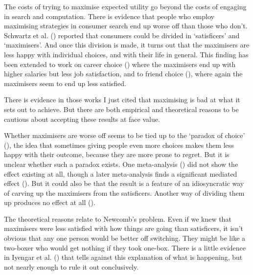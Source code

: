 \documentclass[
  10pt,
  letterpaper,
  twoside]{scrbook}
\begin{document}
The costs of trying to maximise expected utility go beyond the costs of
engaging in search and computation. There is evidence that people who
employ maximising strategies in consumer search end up worse off than
those who don't. Schwartz et al. ()
reported that consumers could be divided in `satisficers' and
`maximisers'. And once this division is made, it turns out that the
maximisers are less happy with individual choices, and with their life
in general. This finding has been extended to work on career choice
()
where the maximisers end up with higher salaries but less job
satisfaction, and to friend choice
(), where again the maximisers seem to end up less satisfied.

There is evidence in those works I just cited that maximising is bad at
what it sets out to achieve. But there are both empirical and
theoretical reasons to be cautious about accepting these results at face
value.

Whether maximisers are worse off seems to be tied up to the `paradox of
choice' (), the idea that
sometimes giving people even more choices makes them less happy with
their outcome, because they are more prone to regret. But it is unclear
whether such a paradox exists. One meta-analysis
() did not show the effect existing at all, though a later
meta-analysis finds a significant mediated effect
().
But it could also be that the result is a feature of an idiosyncratic
way of carving up the maximisers from the satisficers. Another way of
dividing them up produces no effect at all
().

The theoretical reasons relate to Newcomb's problem. Even if we knew
that maximisers were less satisfied with how things are going than
satisficers, it isn't obvious that any one person would be better off
switching. They might be like a two-boxer who would get nothing if they
took one-box. There is a little evidence in Iyengar et al.
() that tells against this
explanation of what is happening, but not nearly enough to rule it out
conclusively.
\end{document}
